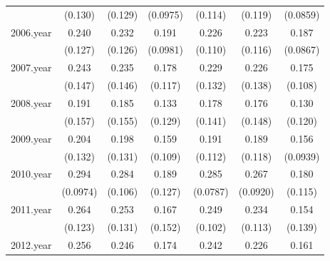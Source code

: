 {\begin{tabular}{l*{6}{c}}
            &     (0.130)         &     (0.129)         &    (0.0975)         &     (0.114)         &     (0.119)         &    (0.0859)         \\
[1em]
2006.year   &       0.240         &       0.232         &       0.191         &       0.226\sym{*}  &       0.223\sym{*}  &       0.187\sym{*}  \\
            &     (0.127)         &     (0.126)         &    (0.0981)         &     (0.110)         &     (0.116)         &    (0.0867)         \\
[1em]
2007.year   &       0.243         &       0.235         &       0.178         &       0.229         &       0.226         &       0.175         \\
            &     (0.147)         &     (0.146)         &     (0.117)         &     (0.132)         &     (0.138)         &     (0.108)         \\
[1em]
2008.year   &       0.191         &       0.185         &       0.133         &       0.178         &       0.176         &       0.130         \\
            &     (0.157)         &     (0.155)         &     (0.129)         &     (0.141)         &     (0.148)         &     (0.120)         \\
[1em]
2009.year   &       0.204         &       0.198         &       0.159         &       0.191         &       0.189         &       0.156         \\
            &     (0.132)         &     (0.131)         &     (0.109)         &     (0.112)         &     (0.118)         &    (0.0939)         \\
[1em]
2010.year   &       0.294\sym{**} &       0.284\sym{**} &       0.189         &       0.285\sym{***}&       0.267\sym{**} &       0.180         \\
            &    (0.0974)         &     (0.106)         &     (0.127)         &    (0.0787)         &    (0.0920)         &     (0.115)         \\
[1em]
2011.year   &       0.264\sym{*}  &       0.253         &       0.167         &       0.249\sym{**} &       0.234\sym{*}  &       0.154         \\
            &     (0.123)         &     (0.131)         &     (0.152)         &     (0.102)         &     (0.113)         &     (0.139)         \\
[1em]
2012.year   &       0.256         &       0.246         &       0.174         &       0.242\sym{*}  &       0.226         &       0.161         \\

\end{tabular}}

